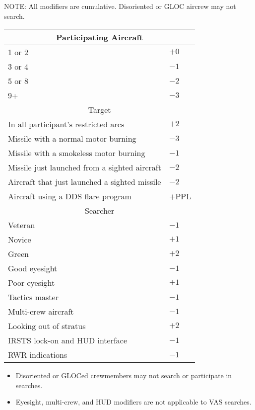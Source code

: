 {\begin{onecolumntable}
\begin{tablenote}{0.9\linewidth}
NOTE: All modifiers are cumulative. Disoriented or GLOC aircrew may not search.
\end{tablenote}
\end{onecolumntable}
}{
\begin{onecolumntable}[p]
\begin{tabularx}{\linewidth}{Xl}
\toprule
\multicolumn{2}{c}{Participating Aircraft}\\
\midrule1 or 2&$+0$\\
3 or 4&$-1$\\
5 or 8&$-2$\\
9+    &$-3$\\
\midrule
\multicolumn{2}{c}{Target}\\
\midrule
In all participant's restricted arcs&$+2$\\
Missile with a normal motor burning&$-3$\\
Missile with a smokeless motor burning&$-1$\\
Missile just launched from a sighted aircraft&$-2$\\
Aircraft that just launched a sighted missile&$-2$\\
Aircraft using a DDS flare program&$+$PPL\\
\midrule
\multicolumn{2}{c}{Searcher}\\
\midrule
Veteran&$-1$\\
Novice&$+1$\\
Green&$+2$\\
Good eyesight&$-1$\\
Poor eyesight&$+1$\\
Tactics master&$-1$\\
Multi-crew aircraft&$-1$\\
Looking out of stratus&$+2$\\
IRSTS lock-on and HUD interface&$-1$\\
RWR indications&$-1$\\
\bottomrule
\end{tabularx}
\begin{tablenote}{1.0\linewidth}
\begin{itemize}
    \item Disoriented or GLOCed crewmembers may not search or participate in searches.
    \item Eyesight, multi-crew, and HUD modifiers are not applicable to VAS searches.
\end{itemize}
\end{tablenote}
\end{onecolumntable}
}
